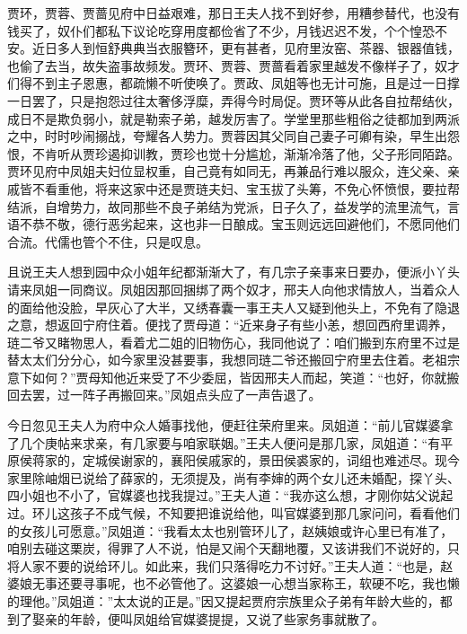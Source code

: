 \documentclass[12pt,oneside]{book}
\begin{document}
贾环，贾蓉、贾蔷见府中日益艰难，那日王夫人找不到好参，用糟参替代，也没有钱买了，奴仆们都私下议论吃穿用度都俭省了不少，月钱迟迟不发，个个惶恐不安。近日多人到恒舒典典当衣服簪环，更有甚者，见府里汝窑、茶器、银器值钱，也偷了去当，故失盗事故频发。贾环、贾蓉、贾蔷看着家里越发不像样子了，奴才们得不到主子恩惠，都疏懒不听使唤了。贾政、凤姐等也无计可施，且是过一日撑一日罢了，只是抱怨过往太奢侈浮糜，弄得今时局促。贾环等从此各自拉帮结伙，成日不是欺负弱小，就是勒索子弟，越发厉害了。学堂里那些粗俗之徒都加到两派之中，时时吵闹搦战，夸耀各人势力。贾蓉因其父同自己妻子可卿有染，早生出怨恨，不肯听从贾珍遏抑训教，贾珍也觉十分尴尬，渐渐冷落了他，父子形同陌路。贾环见府中凤姐夫妇位显权重，自己竟有如同无，再兼品行难以服众，连父亲、亲戚皆不看重他，将来这家中还是贾琏夫妇、宝玉拔了头筹，不免心怀愤恨，要拉帮结派，自增势力，故同那些不良子弟结为党派，日子久了，益发学的流里流气，言语不恭不敬，德行恶劣起来，这也非一日酿成。宝玉则远远回避他们，不愿同他们合流。代儒也管个不住，只是叹息。

且说王夫人想到园中众小姐年纪都渐渐大了，有几宗子亲事来日要办，便派小丫头请来凤姐一同商议。凤姐因那回捆绑了两个奴才，邢夫人向他求情放人，当着众人的面给他没脸，早灰心了大半，又绣春囊一事王夫人又疑到他头上，不免有了隐退之意，想返回宁府住着。便找了贾母道：“近来身子有些小恙，想回西府里调养，琏二爷又睹物思人，看着尤二姐的旧物伤心，我同他说了：咱们搬到东府里不过是替太太们分分心，如今家里没甚要事，我想同琏二爷还搬回宁府里去住着。老祖宗意下如何？”贾母知他近来受了不少委屈，皆因邢夫人而起，笑道：“也好，你就搬回去罢，过一阵子再搬回来。”凤姐点头应了一声告退了。

今日忽见王夫人为府中众人婚事找他，便赶往荣府里来。凤姐道：“前儿官媒婆拿了几个庚帖来求亲，有几家要与咱家联姻。”王夫人便问是那几家，凤姐道：“有平原侯蒋家的，定城侯谢家的，襄阳侯戚家的，景田侯裘家的，词组也难述尽。现今家里除岫烟已说给了薛家的，无须提及，尚有李婶的两个女儿还未婚配，探丫头、四小姐也不小了，官媒婆也找我提过。”王夫人道：“我亦这么想，才刚你姑父说起过。环儿这孩子不成气候，不知要把谁说给他，叫官媒婆到那几家问问，看看他们的女孩儿可愿意。”凤姐道：“我看太太也别管环儿了，赵姨娘或许心里已有准了，咱别去碰这栗炭，得罪了人不说，怕是又闹个天翻地覆，又该讲我们不说好的，只将人家不要的说给环儿。如此来，我们只落得吃力不讨好。”王夫人道：“也是，赵婆娘无事还要寻事呢，也不必管他了。这婆娘一心想当家称王，软硬不吃，我也懒的理他。”凤姐道：”太太说的正是。”因又提起贾府宗族里众子弟有年龄大些的，都到了娶亲的年龄，便叫凤姐给官媒婆提提，又说了些家务事就散了。
\end{document}
